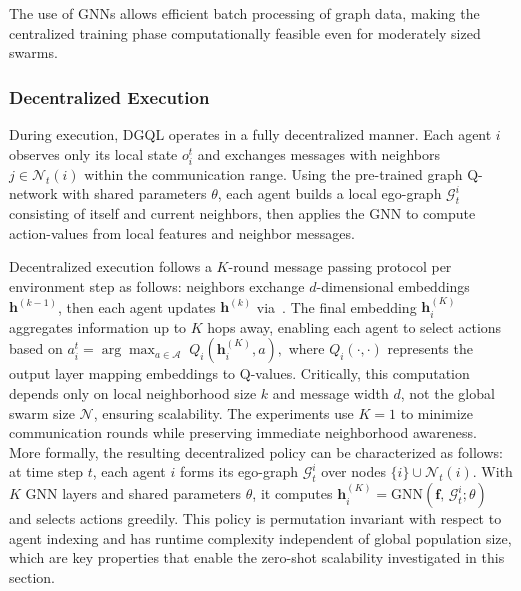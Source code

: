 The use of \glspl{GNN} allows efficient batch processing of graph data, 
 making the centralized training phase computationally 
 feasible even for moderately sized swarms.
 
\subsubsection{Decentralized Execution}
During execution, 
 DGQL operates in a fully decentralized manner. 
%
Each agent \(i\) observes only its local state \(o_i^t\) 
 and exchanges messages with neighbors \(j\in\mathcal{N}_t(i)\) 
 within the communication range. 
%
Using the pre-trained graph Q-network with shared parameters \(\theta\), 
 each agent builds a local ego-graph \(\mathcal{G}_t^i\)  
 consisting of itself and current neighbors, 
 then applies the GNN to compute action-values from local features and neighbor messages.

Decentralized execution follows a \(K\)-round message passing protocol 
 per environment step as follows:
 neighbors exchange \(d\)-dimensional embeddings \(\mathbf{h}^{(k-1)}\),
 then each agent updates \(\mathbf{h}^{(k)}\) via~. 
%
The final embedding \(\mathbf{h}_i^{(K)}\) aggregates information up to \(K\) hops away, 
 enabling each agent to select actions based on 
 \(
  a_i^t = \arg\max_{a\in\mathcal{A}} \; Q_i(\mathbf{h}_i^{(K)}, a),
 \)
 where $Q_i(\cdot, \cdot)$ represents the output layer mapping embeddings to Q-values.
%
Critically, 
 this computation depends only on local neighborhood size \(k\) and message width \(d\), 
 not the global swarm size \(\mathcal{N}\), 
 ensuring scalability. 
% 
The experiments use \(K{=}1\) to minimize communication rounds 
 while preserving immediate neighborhood awareness.
%
More formally, 
 the resulting decentralized policy can be characterized as follows:
 at time step \(t\),
 each agent \(i\) forms its ego-graph \(\mathcal{G}_t^i\) over nodes \(\{i\}\cup\mathcal{N}_t(i)\). 
% 
With \(K\) GNN layers and shared parameters \(\theta\), 
 it computes \(\mathbf{h}_i^{(K)}=\mathrm{GNN}(\mathbf{f},\,\mathcal{G}_t^i;\theta)\) 
 and selects actions greedily.
%
This policy is permutation invariant with respect to agent indexing 
 and has runtime complexity independent of global population size,
 which are key properties that enable the zero-shot scalability investigated in this section.

